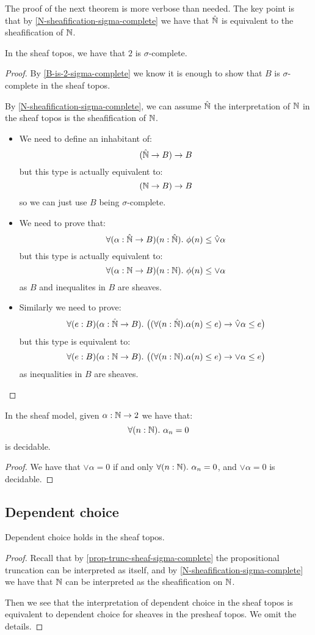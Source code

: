 The proof of the next theorem is more verbose than needed. The key point is that by \cref{N-sheafification-sigma-complete} we have that $\hat{\mathbb{N}}$ is equivalent to the sheafification of $\mathbb{N}$. 

\begin{theorem}
In the sheaf topos, we have that $2$ is $\sigma$-complete.
\end{theorem}

\begin{proof}
By \cref{B-is-2-sigma-complete} we know it is enough to show that $B$ is $\sigma$-complete in the sheaf topos. 

By \cref{N-sheafification-sigma-complete}, we can assume $\hat{\mathbb{N}}$ the interpretation of $\mathbb{N}$ in the sheaf topos is the sheafification of $\mathbb{N}$.
\begin{itemize}
\item We need to define an inhabitant of:
\[(\hat{\mathbb{N}} \to B) \to B\]
but this type is actually equivalent to:
\[(\mathbb{N}\to B) \to B\]
so we can just use $B$ being $\sigma$-complete.
\item We need to prove that:
\[\forall (\alpha:\hat{\mathbb{N}}\to B)(n:\hat{\mathbb{N}}).\ \phi(n)\leq \hat{\lor}\alpha\]
but this type is actually equivalent to:
\[\forall (\alpha:\mathbb{N}\to B)(n:\mathbb{N}).\ \phi(n)\leq \lor\alpha\]
as $B$ and inequalites in $B$ are sheaves.
\item Similarly we need to prove:
\[\forall (e:B)(\alpha:\hat{\mathbb{N}}\to B).\ \big((\forall(n:\hat{\mathbb{N}}). \alpha(n)\leq e) \to \hat{\lor} \alpha \leq e\big)\]
but this type is equivalent to:
\[\forall (e:B)(\alpha:\mathbb{N}\to B).\ \big((\forall(n:\mathbb{N}). \alpha(n)\leq e) \to \lor \alpha \leq e\big)\]
as inequalities in $B$ are sheaves.
\end{itemize}
\end{proof}

\begin{corollary}[WLPO]
In the sheaf model, given $\alpha:\mathbb{N}\to 2$ we have that:
\[\forall(n:\N).\ \alpha_n=0\]
is decidable.
\end{corollary}

\begin{proof}
We have that $\lor \alpha = 0$ if and only $\forall(n:\mathbb{N}).\ \alpha_n = 0$, and $\lor \alpha = 0$ is decidable.
\end{proof}


\subsection{Dependent choice}

\begin{theorem}[DC]
Dependent choice holds in the sheaf topos.
\end{theorem}

\begin{proof}
Recall that by \cref{prop-trunc-sheaf-sigma-complete} the propositional truncation can be interpreted as itself, and by \cref{N-sheafification-sigma-complete} we have that $\mathbb{N}$ can be interpreted as the sheafification on $\mathbb{N}$.

Then we see that the interpretation of dependent choice in the sheaf topos is equivalent to dependent choice for sheaves in the presheaf topos. We omit the details.
\end{proof}